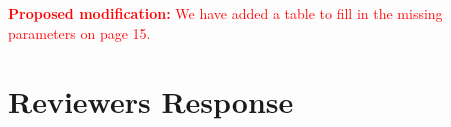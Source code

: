 \documentclass[12pt,one-column]{article}
\begin{document}
\noindent\textcolor{red}{\textbf{Proposed modification: }
We have added a table to fill in the missing parameters on page 15.
}

	
\section{Reviewers Response}
\end{document}
